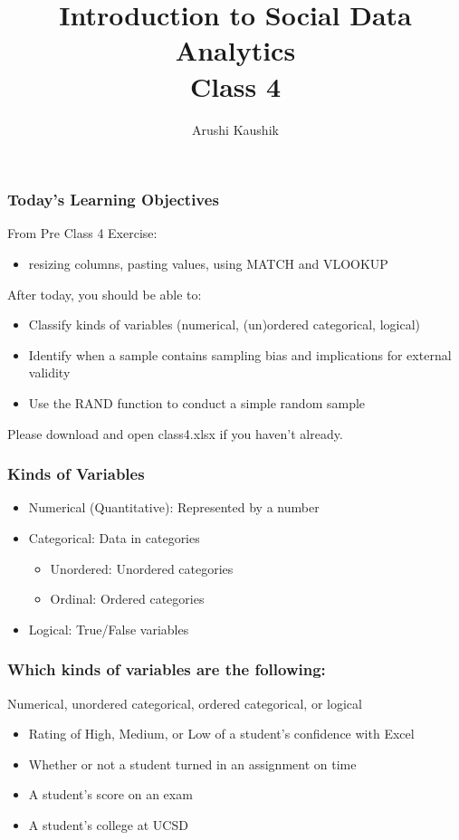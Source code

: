 \documentclass[11pt]{beamer}
\title[Class 4]{Introduction to Social Data Analytics \\
\bigskip Class 4}
\author[Kaushik]{Arushi Kaushik}
\institute[UCSD]{arkaushi@ucsd.edu}
\date{}
\begin{document}
\frame{\titlepage}


\begin{frame}
 \frametitle{Today's Learning Objectives}
 From Pre Class 4 Exercise: 
 \begin{itemize}
 	\item resizing columns, pasting values, using MATCH and VLOOKUP
\end{itemize} \pause
\bigskip
 After today, you should be able to:
\begin{itemize}
\item Classify kinds of variables (numerical, (un)ordered categorical, logical)
\item Identify when a sample contains sampling bias and implications for external validity
\item Use the RAND function to conduct a simple random sample
\end{itemize} \pause \bigskip 
Please download and open class4.xlsx if you haven't already.
\end{frame}

\begin{frame}
 \frametitle{Kinds of Variables}
\begin{itemize}
\item \alert{Numerical} (Quantitative): Represented by a number \pause
\item \alert{Categorical}: Data in categories
\begin{itemize}
\item Unordered: Unordered categories
\item Ordinal: Ordered categories
\end{itemize} \pause
\item \alert{Logical}: True/False variables
\end{itemize}
\end{frame}

\begin{frame}
 \frametitle{Which kinds of variables are the following:}
\alert{Numerical, unordered categorical, ordered categorical, or logical}
\begin{itemize}
\pause
\bigskip
\item Rating of High, Medium, or Low of a student's confidence with Excel \pause
\item Whether or not a student turned in an assignment on time \pause
\item A student's score on an exam \pause
\item A student's college at UCSD
\end{itemize}
\end{frame}
\end{document}
